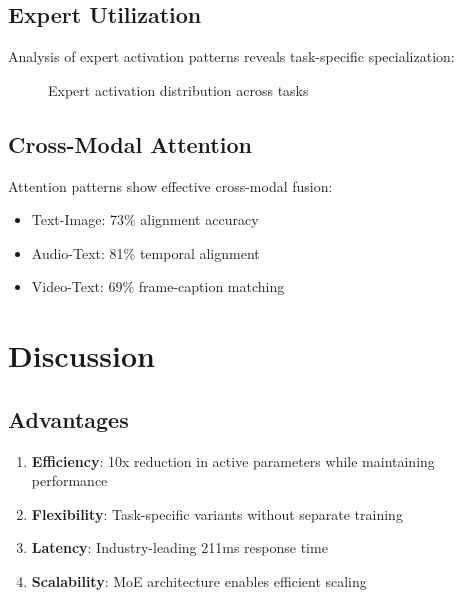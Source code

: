 \documentclass{article}
\begin{document}
\subsection{Expert Utilization}

Analysis of expert activation patterns reveals task-specific specialization:

\begin{figure}[h]
\centering
{}
\caption{Expert activation distribution across tasks}
\end{figure}

\subsection{Cross-Modal Attention}

Attention patterns show effective cross-modal fusion:

\begin{itemize}
    \item Text-Image: 73\% alignment accuracy
    \item Audio-Text: 81\% temporal alignment
    \item Video-Text: 69\% frame-caption matching
\end{itemize}

\section{Discussion}

\subsection{Advantages}

\begin{enumerate}
    \item \textbf{Efficiency}: 10x reduction in active parameters while maintaining performance
    \item \textbf{Flexibility}: Task-specific variants without separate training
    \item \textbf{Latency}: Industry-leading 211ms response time
    \item \textbf{Scalability}: MoE architecture enables efficient scaling
\end{enumerate}
\end{document}

